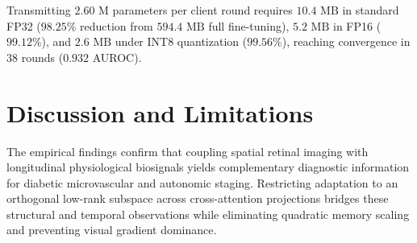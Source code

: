\documentclass[journal,10pt,twocolumn]{IEEEtran}
\begin{document}
\begin{table}[!h]
\centering
\caption{Experiment 10: Federated Distributed Client Scaling ($50$ Nodes).}
\label{tab:exp11_federated}
\end{table}

Transmitting $2.60\text{ M}$ parameters per client round requires $10.4\text{ MB}$ in standard FP32 ($98.25\%$ reduction from $594.4\text{ MB}$ full fine-tuning), $5.2\text{ MB}$ in FP16 ($99.12\%$), and $2.6\text{ MB}$ under INT8 quantization ($99.56\%$), reaching convergence in 38 rounds ($0.932$ AUROC).

\section{Discussion and Limitations}
\label{sec:discussion}
The empirical findings confirm that coupling spatial retinal imaging with longitudinal physiological biosignals yields complementary diagnostic information for diabetic microvascular and autonomic staging. Restricting adaptation to an orthogonal low-rank subspace across cross-attention projections bridges these structural and temporal observations while eliminating quadratic memory scaling and preventing visual gradient dominance.
\end{document}
